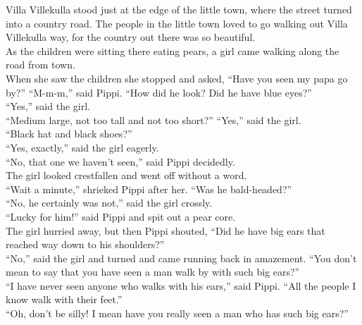 \documentclass{standard}
\begin{document}
Villa Villekulla stood just at the edge of the little town, where the street turned into a country road. The people in the little town loved to go walking out Villa Villekulla way, for the country out there was so beautiful.\\

As the children were sitting there eating pears, a girl came walking along the road from town.\\

When she saw the children she stopped and asked, “Have you seen my papa go by?” “M-m-m,” said Pippi. “How did he look? Did he have blue eyes?”\\

“Yes,” said the girl.\\

“Medium large, not too tall and not too short?” “Yes,” said the girl.\\

“Black hat and black shoes?”\\

“Yes, exactly,” said the girl eagerly.\\

“No, that one we haven’t seen,” said Pippi decidedly.\\

The girl looked crestfallen and went off without a word.\\

“Wait a minute,” shrieked Pippi after her. “Was he bald-headed?”\\

“No, he certainly was not,” said the girl crossly.\\

“Lucky for him!” said Pippi and spit out a pear core.\\

The girl hurried away, but then Pippi shouted, “Did he have big ears that reached way down to his shoulders?”\\

“No,” said the girl and turned and came running back in amazement. “You don’t mean to say that you have seen a man walk by with such big ears?”\\

“I have never seen anyone who walks with his ears,” said Pippi. “All the people I know walk with their feet.”\\

“Oh, don’t be silly! I mean have you really seen a man who has such big ears?”\\
\end{document}
